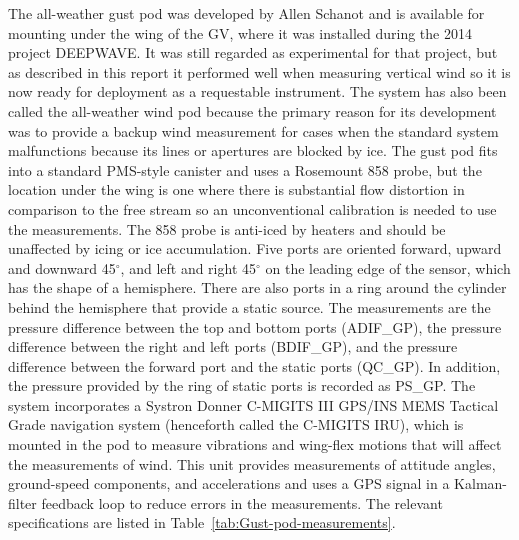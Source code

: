 \documentclass[12pt,twoside,english]{article}\usepackage[]{graphicx}\usepackage[]{color}
\let\OrgIndex\index
\renewcommand*{\index}[1]{\OrgIndex{#1}}
\begin{document}
{The all-weather gust pod was developed by Allen Schanot and is available for mounting under the wing of the GV, where it was installed during the 2014 project DEEPWAVE. It was still regarded as experimental for that project, but as described in this report it performed well when measuring vertical wind so it is now ready for deployment as a requestable instrument. The system has also been called the all-weather wind pod because the primary reason for its development was to provide a backup wind measurement for cases when the standard system malfunctions because its lines or apertures are blocked by ice. The gust pod fits into a standard PMS-style canister and uses a Rosemount 858 probe, but the location under the wing is one where there is substantial flow distortion in comparison to the free stream so an unconventional calibration is needed to use the measurements. The 858 probe is anti-iced by heaters and should be unaffected by icing or ice accumulation. Five ports are oriented forward, upward and downward 45$^{\circ}$, and left and right 45$^{\circ}$ on the leading edge of the sensor, which has the shape of a hemisphere. There are also ports in a ring around the cylinder behind the hemisphere that provide a static source. The measurements are the pressure difference between the top and bottom ports (ADIF\_GP), the pressure difference between the right and left ports (BDIF\_GP), and the pressure difference between the forward port and the static ports (QC\_GP). In addition, the pressure provided by the ring of static ports is recorded as PS\_GP. The system incorporates a Systron Donner C-MIGITS III GPS/INS MEMS Tactical Grade navigation system (henceforth called the C-MIGITS IRU), which is mounted in the pod to measure vibrations and wing-flex motions that will affect the measurements of wind. This unit provides measurements of attitude angles, ground-speed components, and accelerations and uses a GPS signal in a Kalman-filter feedback loop to reduce errors in the measurements. The relevant specifications are listed in Table~\ref{tab:Gust-pod-measurements}. 

}
\end{document}
